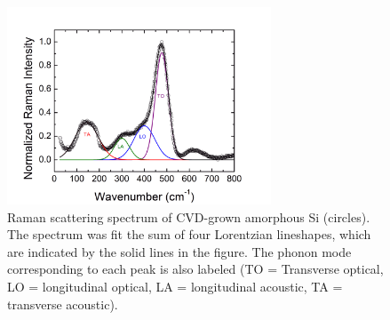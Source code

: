 \begin{figure}
\begin{center}
\includegraphics[width=0.7\textwidth]{./appendixC/siaddl4.png}
\caption[Raman scattering spectrum of CVD-grown amorphous Si.]{Raman scattering spectrum of CVD-grown amorphous Si (circles). The spectrum was fit the sum of four Lorentzian lineshapes, which are indicated by the solid lines in the figure. The phonon mode corresponding to each peak is also labeled (TO = Transverse optical, LO = longitudinal optical, LA = longitudinal acoustic, TA = transverse acoustic).}
\label{f:siaddl4}
\end{center}
\end{figure}
 

